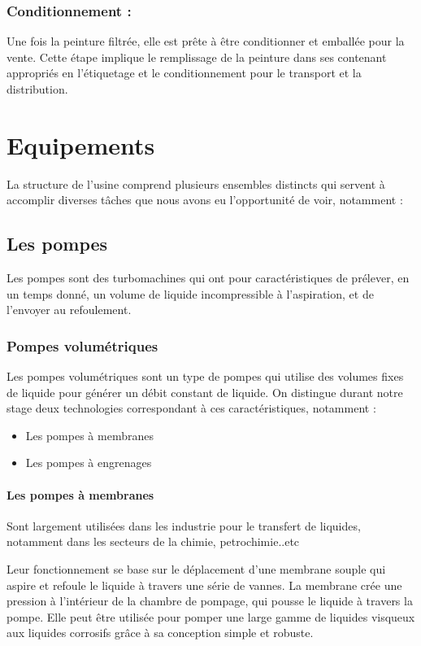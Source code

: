 \documentclass[20pt,a4paper]{report}
\begin{document}
\begin{large}
			\subsection{Conditionnement : }
Une fois la peinture filtrée, elle est prête à être conditionner et emballée pour la vente. Cette étape implique le remplissage de la peinture dans ses contenant appropriés en l’étiquetage et le conditionnement pour le transport et la distribution.

\newpage

	\chapter{Equipements}
	
	\newpage

La structure de l’usine comprend plusieurs ensembles distincts qui servent à accomplir diverses tâches que nous avons eu l’opportunité de voir, notamment :
		\section{Les pompes}
Les pompes sont des turbomachines qui ont pour caractéristiques de prélever, en un temps donné, un volume de liquide incompressible à l'aspiration, et de l'envoyer au refoulement.

			\subsection{Pompes volumétriques }
Les pompes volumétriques sont un type de pompes qui utilise des volumes fixes de liquide pour générer un débit constant de liquide. On distingue durant notre stage deux technologies correspondant à ces caractéristiques, notamment :

\begin{itemize}
	\item Les pompes à membranes
	\item Les pompes à engrenages
\end{itemize}

				\subsubsection{Les pompes à membranes }
Sont largement utilisées dans les industrie pour le transfert de liquides, notamment dans les secteurs de la chimie, petrochimie..etc

Leur fonctionnement se base sur le déplacement d’une membrane souple qui aspire et refoule le liquide à travers une série de vannes. La membrane crée une pression à l’intérieur de la chambre de pompage, qui pousse le liquide à travers la pompe. Elle peut être utilisée pour pomper une large gamme de liquides visqueux aux liquides corrosifs grâce à sa conception simple et robuste.


\end{large}
\end{document}
